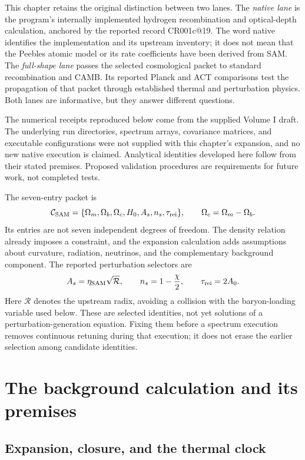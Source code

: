 This chapter retains the original distinction between two lanes. The \emph{native lane} is the program's internally implemented hydrogen recombination and optical-depth calculation, anchored by the reported record CR001c@19. The word native identifies the implementation and its upstream inventory; it does not mean that the Peebles atomic model or its rate coefficients have been derived from SAM. The \emph{full-shape lane} passes the selected cosmological packet to standard recombination and CAMB. Its reported Planck and ACT comparisons test the propagation of that packet through established thermal and perturbation physics. Both lanes are informative, but they answer different questions.

The numerical receipts reproduced below come from the supplied Volume I draft. The underlying run directories, spectrum arrays, covariance matrices, and executable configurations were not supplied with this chapter's expansion, and no new native execution is claimed. Analytical identities developed here follow from their stated premises. Proposed validation procedures are requirements for future work, not completed tests.

The seven-entry packet is
\begin{equation}
\mathcal C_{\rm SAM}=\{\Omega_m,\Omega_b,\Omega_c,H_0,A_s,n_s,\tau_{\rm rei}\},\qquad
\Omega_c=\Omega_m-\Omega_b.
\label{c9:packet}
\end{equation}
Its entries are not seven independent degrees of freedom. The density relation already imposes a constraint, and the expansion calculation adds assumptions about curvature, radiation, neutrinos, and the complementary background component. The reported perturbation selectors are
\begin{equation}
 A_s=\eta_{\rm SAM}\sqrt{\mathcal R},\qquad
 n_s=1-\frac{\chi}{2},\qquad \tau_{\rm rei}=2A_0.
\label{c9:selectors}
\end{equation}
Here $\mathcal R$ denotes the upstream radix, avoiding a collision with the baryon-loading variable used below. These are selected identities, not yet solutions of a perturbation-generation equation. Fixing them before a spectrum execution removes continuous retuning during that execution; it does not erase the earlier selection among candidate identities.

\section{The background calculation and its premises}
\subsection{Expansion, closure, and the thermal clock}

